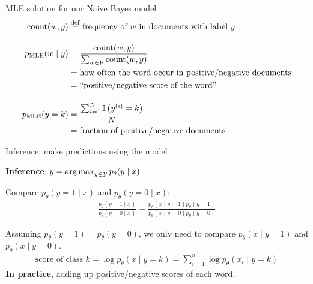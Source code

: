 \documentclass[usenames,dvipsnames,notes,11pt,aspectratio=169]{beamer}
\newcommand{\pdfnote}[1]{}
\begin{document}

\begin{frame}
    {MLE solution for our Naive Bayes model}
    \begin{align*}
        \text{count}(w, y) &\stackrel{\rm def}{=} \text{frequency of $w$ in documents with label $y$}\\[1em]
        p_{\text{MLE}}(w\mid y) &= \frac{\text{count}(w, y)}{\sum_{w\in\mathcal{V}}\text{count}(w, y)}\\
        &= \text{how often the word occur in positive/negative documents}\\
        &= \text{``positive/negative score of the word''}\\[1em]
        p_{\text{MLE}}(y=k) &= \frac{\sum_{i=1}^N \mathbb{I}\left( y^{(i)}=k \right)}{N}\\
        &= \text{fraction of positive/negative documents}
    \end{align*}

\end{frame}

\begin{frame}
    {Inference: make predictions using the model}

    \textbf{Inference}: $y=\operatorname*{arg\,max}_{y\in\mathcal{Y}} p_\theta(y\mid x)$ 

    \medskip
    \pause
    Compare $p_\theta(y=1\mid x)$ and $p_\theta(y=0\mid x)$:
    \begin{align*}
        \frac{p_\theta(y=1\mid x)}{p_\theta(y=0\mid x)} = 
        \frac{p_\theta(x\mid y=1)p_\theta(y=1)}{p_\theta(x\mid y=0)p_\theta(y=0)}
    \end{align*}

    \pause
    Assuming $p_\theta(y=1)=p_\theta(y=0)$, we only need to compare $p_\theta(x\mid y=1)$ and $p_\theta(x\mid y=0)$.
    \begin{align*}
        \text{score of class $k$} = \log p_\theta(x \mid y=k) = \sum_{i=1}^n \log p_\theta(x_i \mid y=k) 
    \end{align*}
    {\bf In practice}, adding up positive/negative scores of each word.
\end{frame}
\end{document}
